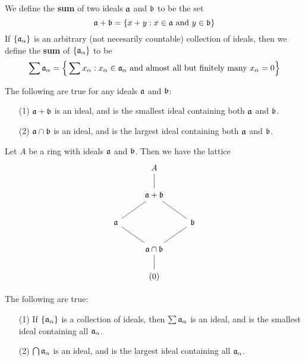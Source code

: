 \begin{definition}
  We define the \textbf{sum} of two ideals $\af$ and  $\bf$ to be the set
  \begin{equation*}
    \af+\bf=\{x+y : x \in \af \text{ and } y \in \bf\}
  \end{equation*}
  If $\{\af_\a\}$ is an arbitrary (not necesarily countable) collection of
  ideals, then we define the \textbf{sum} of $\{\af_\a\}$ to be
  \begin{equation*}
    \sum{\af_\a}=
    \Big{\{} \sum{x_\a} : x_\a \in \af_\a \text{ and almost all but finitely
    many } x_\a=0 \Big{\}}
  \end{equation*}
\end{definition}

\begin{lemma}\label{lemma_5.5.5}
  The following are true for any ideals $\af$ and $\bf$:
  \begin{enumerate}
    \item[(1)] $\af+\bf$ is an ideal, and is the smallest ideal containing both
      $\af$ and  $\bf$.

    \item[(2)] $\af \cap \bf$ is an ideal, and is the largest ideal containing
      both $\af$ and $\bf$.
  \end{enumerate}
\end{lemma}
\begin{corollary}
  Let $A$ be a ring with ideals $\af$ and $\bf$. Then we have the lattice
  \[\begin{tikzcd}
  & A \\
  & {\af+\bf} \\
    \af && \bf \\
        & \af \cap \bf \\
        & {(0)}
        \arrow[no head, from=1-2, to=2-2]
        \arrow[no head, from=2-2, to=3-1]
        \arrow[no head, from=3-1, to=4-2]
        \arrow[no head, from=4-2, to=3-3]
        \arrow[no head, from=3-3, to=2-2]
        \arrow[no head, from=4-2, to=5-2]
  \end{tikzcd}\]
\end{corollary}

\begin{lemma}\label{lemma_5.5.6}
  The following are true:
  \begin{enumerate}
    \item[(1)] If $\{\af_\a\}$ is a collection of ideals, then $\sum{\af_\a}$ is
      an ideal, and is the smallest ideal containing all $\af_\a$.

    \item[(2)] $\bigcap{\af_\a}$ is an ideal, and is the largest ideal
      containing all $\af_\a$.
  \end{enumerate}
\end{lemma}

